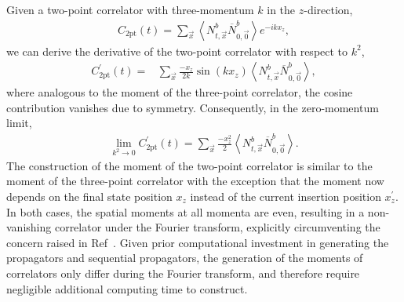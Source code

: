 \documentclass{PoS}
\begin{document}
Given a two-point correlator with three-momentum $k$ in the $z$-direction,
\begin{align}
C_{\text{2pt}}(t) = \sum_{\vec{x}} \left< N^b_{t,\vec{x}}\overline{N}^b_{0,\vec{0}}\right> e^{-ikx_z},
\label{eq:2pt}
\end{align}
we can derive the derivative of the two-point correlator with respect to $k^2$,
\begin{align}
C^\prime_{\text{2pt}}(t)
= & \sum_{\vec{x}}\frac{-x_z}{2k} \sin\left(kx_z\right) \left<N^b_{t, \vec{x}}\overline{N}^b_{0,\vec{0}} \right> ,
\label{eq:2ptmoment}
\end{align}
where analogous to the moment of the three-point correlator, the cosine contribution vanishes due to symmetry.  Consequently, in the zero-momentum limit,
\begin{align}
\lim_{k^2\rightarrow 0 } C^\prime_{\text{2pt}}(t) = \sum_{\vec{x}} \frac{-x_z^2}{2}\left<N^b_{t, \vec{x}}\overline{N}^b_{0,\vec{0}} \right>.
\label{eq:2ptmoment0}
\end{align}
The construction of the moment of the two-point correlator is similar to the moment of the three-point correlator with the exception that the moment now depends on the final state position $x_z$ instead of the current insertion position $x^\prime_z$. In both cases, the spatial moments at all momenta are even, resulting in a non-vanishing correlator under the Fourier transform, explicitly circumventing the concern raised in Ref~\cite{Wilcox:2002zt}.  Given prior computational investment in generating the propagators and sequential propagators, the generation of the moments of correlators only differ during the Fourier transform, and therefore require negligible additional computing time to construct.
\end{document}
